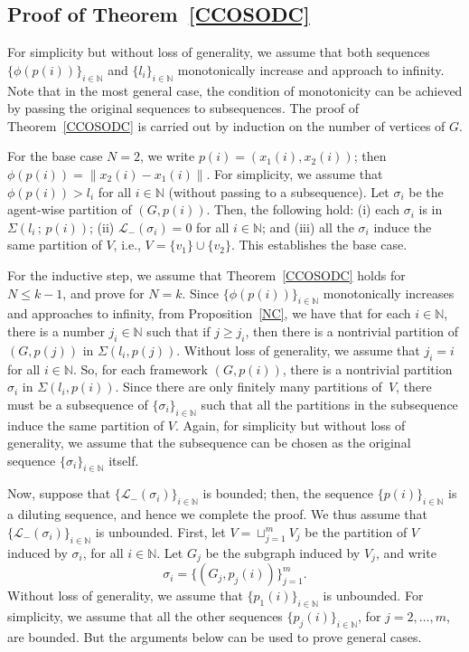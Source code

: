 \documentclass[10pt,twocolumn,twoside]{IEEEtran}
\renewcommand{\cal}{\mathcal}
\renewcommand{\(}{\left (}
\renewcommand{\)}{\right )}
\renewcommand{\;}{\,;\,}
\newcommand{\N}{\mathbb{N}}
\begin{document}
\subsection{Proof of Theorem~\ref{CCOSODC}}\label{ssec:ProofIII}
For simplicity but without loss of generality, we assume  that both sequences $\{ \phi(p(i)) \}_{i\in \N}$ and $\{l_i\}_{i\in \N}$ monotonically increase and approach to infinity. Note that in the most general case, the condition of monotonicity can be achieved by passing the original sequences to subsequences.  
The proof of Theorem~\ref{CCOSODC} is carried out by induction on the number of vertices of $G$. 

For the base case $N = 2$, we  
write $p(i) = (x_1(i),x_2(i))$; then $\phi(p(i)) = \|x_2(i) - x_1(i)\|$. 
For simplicity, we assume that 
$
\phi(p(i)) > l_i 
$ for all $ i\in\N$ (without passing to a subsequence).  
Let $\sigma_i$ be the agent-wise partition of $(G,p(i))$. Then, the following hold: (i) each $\sigma_i$ is in $\Sigma(l_i\; p(i))$; (ii) $\cal{L}_-(\sigma_i) = 0$ for all $i\in \N$; and (iii)  all the $\sigma_i$  induce the same partition of $V$, i.e., $V = \{v_1\} \cup\{v_2\}$. This establishes the base case. 

For the inductive step, we assume that Theorem~\ref{CCOSODC} holds for $N \le k-1$, and prove for $N = k$. 
Since $\{\phi(p(i))\}_{i\in\N}$ monotonically increases and approaches to infinity,  from Proposition~\ref{NC}, we have that for each $i\in \N$, there is a number
$j_i\in \mathbb{N}$ such that  if $j \ge j_i$, then there is a nontrivial partition of $(G,p(j))$ in $\Sigma(l_i, p(j))$. Without loss of generality, we assume that $j_i = i$ for all $i\in \N$. 
So, for each framework $(G,p(i))$, there is a nontrivial partition $\sigma_i$ in $\Sigma(l_i, p(i))$. Since there are only finitely many  partitions of~$V$, there must be a  subsequence of $\{\sigma_i\}_{i\in \N}$ such that all the partitions in the subsequence induce the same partition of $V$. Again, for simplicity but without loss of generality, we assume that the subsequence can be chosen as the original sequence $\{\sigma_i\}_{i\in \N}$ itself. 

Now, suppose that $\{\cal{L}_-(\sigma_i)\}_{i\in\N}$ is bounded; then, the sequence $\{p(i)\}_{i\in\N}$ is a diluting sequence, and hence we complete   the proof. 
We thus assume that $\{\cal{L}_-(\sigma_i)\}_{i\in \N}$ is unbounded.  
First, let 
$V = \sqcup^m_{j=1} V_j$ be the partition of $V$ induced by $\sigma_i$, for all $i\in \N$. Let $G_j$ be the subgraph induced by $V_j$, and write 
$$ \sigma_i = \{(G_j, p_j(i))\}^m_{j=1}.$$ 
Without loss of generality, we assume that  
$\{p_1(i)\}_{i\in \N}$ is unbounded. For simplicity, we assume that all the other sequences $\{p_j(i)\}_{i\in\N}$, for $j = 2,\ldots, m$, are bounded. But the arguments below can be used to prove general cases.
\end{document}
